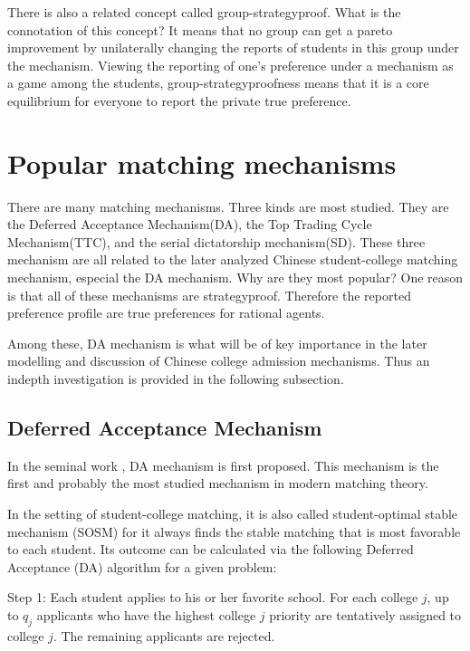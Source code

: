 There is also a related concept called group-strategyproof. What is the connotation of this concept? It means that no group can get a pareto improvement by unilaterally changing the reports of students in this group under the mechanism. Viewing the reporting of one's preference under a mechanism as a game among the students, group-strategyproofness means that it is a core equilibrium for everyone to report the private true preference.



\section{Popular matching mechanisms}
\label{equivalent direct mechanisms}
There are many matching mechanisms. Three kinds are
most studied. They are the Deferred Acceptance Mechanism(DA), the Top
Trading Cycle Mechanism(TTC), and the serial dictatorship mechanism(SD).
These three mechanism are all related to the later analyzed Chinese
student-college matching mechanism, especial the DA mechanism. Why are they most popular? 
One reason is that all of these mechanisms are
strategyproof. Therefore the reported preference profile are true preferences
for rational agents.

Among these, DA mechanism is what will be of key importance in the later modelling and discussion of Chinese college admission
mechanisms. Thus an indepth investigation is provided in the following subsection.



\subsection{Deferred Acceptance Mechanism}
In the seminal work \parencite{Gale1962}, DA mechanism is first
proposed. This mechanism is the first and probably the most studied
mechanism in modern matching theory. 

In the setting of student-college matching, it is also called
student-optimal stable mechanism (SOSM) for it always finds the stable
matching that is most favorable to each student. Its outcome can be
calculated via the following Deferred
Acceptance (DA) algorithm for a given problem:

 Step 1: Each student applies to his or her favorite school. For each
college $j$, up to $q_j$  applicants who have
the highest college $j$ priority are tentatively assigned to college $j$. The remaining applicants are
rejected.

